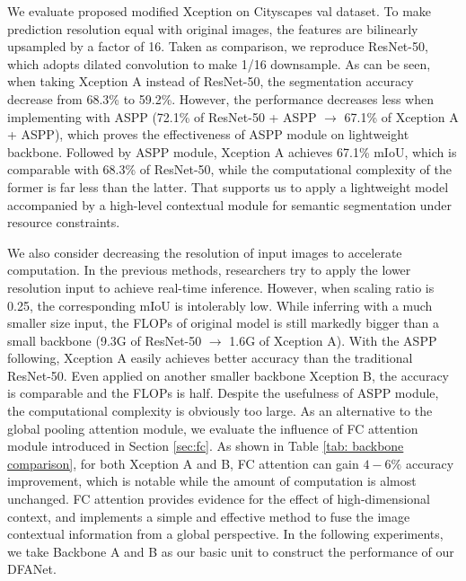 \documentclass[10pt,twocolumn,letterpaper]{article}
\begin{document}
We evaluate proposed modified Xception on Cityscapes val dataset. To make prediction resolution equal with original images, the features are bilinearly upsampled by a factor of 16. Taken as comparison, we reproduce ResNet-50, which adopts dilated convolution to make 1/16 downsample. As can be seen, when taking Xception A instead of ResNet-50, the segmentation accuracy decrease from 68.3\% to 59.2\%.  However, the performance decreases less when implementing with ASPP\cite{deeplanv3} (72.1\% of ResNet-50 + ASPP $\rightarrow$ 67.1\% of Xception A + ASPP), which proves the effectiveness of ASPP module on lightweight backbone. Followed by ASPP module, Xception A achieves 67.1\% mIoU, which is comparable with 68.3\% of ResNet-50, while the computational complexity of the former is far less than the latter. That supports us to apply a lightweight model accompanied by a high-level contextual module for semantic segmentation under resource constraints. 

We also consider decreasing the resolution of input images to accelerate computation. In the previous methods, researchers try to apply the lower resolution input to achieve real-time inference. However, when scaling ratio is 0.25, the corresponding mIoU is intolerably low. While inferring with a much smaller size input, the FLOPs of original model is still markedly bigger than a small backbone (9.3G of ResNet-50 $\rightarrow$ 1.6G of Xception A). With the ASPP following, Xception A easily achieves better accuracy than the traditional ResNet-50. Even applied on another smaller backbone Xception B, the accuracy is comparable and the FLOPs is half. Despite the usefulness of ASPP module, the computational complexity is obviously too large. As an alternative to the global pooling attention module, we evaluate the influence of FC attention module introduced in Section \ref{sec:fc}. As shown in Table \ref{tab: backbone comparison}, for both Xception A and B, FC attention can gain $4-6\%$ accuracy improvement, which is notable while the amount of computation is almost unchanged. FC attention provides evidence for the effect of high-dimensional context, and implements a simple and effective method to fuse the image contextual information from a global perspective. In the following experiments, we take Backbone A and B as our basic unit to construct the performance of our DFANet.
\end{document}
